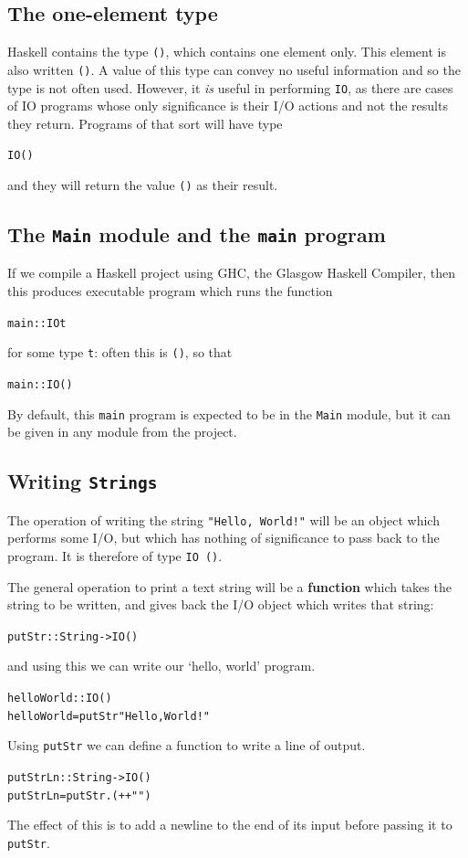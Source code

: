 \subsection*{The one-element type}

Haskell contains the type \texttt{()}, which contains one element only.
This element is also written \texttt{()}. A value of this type can convey no useful
information  and so the type is not often used. However, it {\em is\/} useful
in performing \texttt{IO}, as there are cases of IO programs
whose only significance is their I/O actions and not the results they return.
Programs of that sort will have type
\begin{alltt}
IO ()\minx{()}
\end{alltt}
and they will return the value \texttt{()} as their result.


\subsection*{The \texttt{Main} module and the \texttt{main} program}

If we compile a Haskell project using GHC, the Glasgow Haskell Compiler, then this produces executable program which runs the function
\begin{alltt}
main :: IO t
\end{alltt}
for some type \texttt{t}: often this is \texttt{()}, so that
\begin{alltt}
main :: IO ()
\end{alltt}
By default, this \texttt{main} program is expected to be in the \texttt{Main} module, but it can be given in any module from the project.


\subsection*{Writing \texttt{Strings}}

The operation of writing the string \texttt{"Hello, World!"} will be an
object which performs some I/O, but which has nothing of significance to
pass back to the program. It is therefore of type \texttt{IO ()}. 

The general operation to print a text string will be a 
\textbf{function} which
takes the string to be written, and gives back the I/O object which writes
that string:
\begin{alltt}
putStr :: String -> IO ()
\end{alltt}
and using this we can write our `hello, world' program.
\begin{alltt}
helloWorld :: IO ()
helloWorld = putStr "Hello, World!"
\end{alltt}
Using \texttt{putStr} we can define a function to write a line of output.
\begin{alltt}
putStrLn :: String -> IO ()
putStrLn = putStr . (++ "")
\end{alltt}
The effect of this is to add
a newline to the end of its input before passing it to
\texttt{putStr}.

